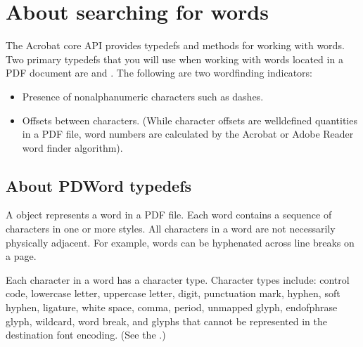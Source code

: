 \documentclass[letterpaper,12pt,english,openany,oneside]{sphinxmanual}
\begin{document}
\section{About searching for words}
\label{\detokenize{Plugins_Words:about-searching-for-words}}
The Acrobat core API provides typedefs and methods for working with words. Two primary typedefs that you will use when working with words located in a PDF document are  and . The following are two word\sphinxhyphen{}finding indicators:
\begin{itemize}
\item {} 
Presence of non\sphinxhyphen{}alphanumeric characters such as dashes.

\item {} 
Offsets between characters. (While character offsets are well\sphinxhyphen{}defined quantities in a PDF file, word numbers are calculated by the Acrobat or Adobe Reader word finder algorithm).

\end{itemize}


\subsection{About PDWord typedefs}
\label{\detokenize{Plugins_Words:about-pdword-typedefs}}
A  object represents a word in a PDF file. Each word contains a sequence of characters in one or more styles. All characters in a word are not necessarily physically adjacent. For example, words can be hyphenated across line breaks on a page.

Each character in a word has a character type. Character types include: control code, lowercase letter, uppercase letter, digit, punctuation mark, hyphen, soft hyphen, ligature, white space, comma, period, unmapped glyph, end\sphinxhyphen{}of\sphinxhyphen{}phrase glyph, wildcard, word break, and glyphs that cannot be represented in the destination font encoding. (See the .)
\end{document}
